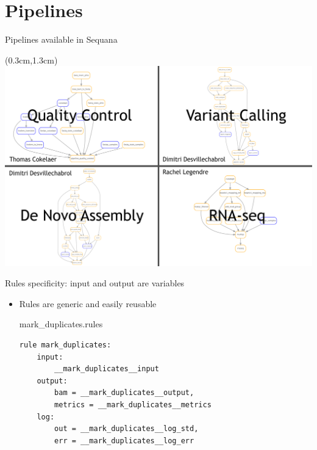 \documentclass{beamer}
\begin{document}
\section{Pipelines}

\begin{frame}{Pipelines available in Sequana}
    \begin{textblock*}{5cm}(0.3cm,1.3cm)
        \includegraphics[scale=0.215]{images/pipelines}
    \end{textblock*}
\end{frame}

\begin{frame}[fragile]{Rules specificity: input and output are variables}
    \begin{itemize}
        \item Rules are generic and easily reusable
        \begin{block}{mark\_duplicates.rules}
        \begin{lstlisting}
rule mark_duplicates:
    input:
        __mark_duplicates__input
    output:
        bam = __mark_duplicates__output,
        metrics = __mark_duplicates__metrics
    log:
        out = __mark_duplicates__log_std,
        err = __mark_duplicates__log_err
        \end{lstlisting}
        \end{block}
    \end{itemize}
\end{frame}
\end{document}
